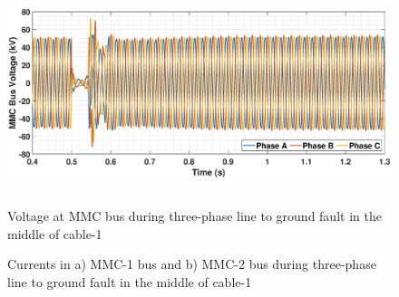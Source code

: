 \begin{figure}[H]
\centering
    \includegraphics[height = 6.5cm,width = 17.5cm]{Diagrams/Chapter_5/VABC_MMC_1_3phaseSC.eps}
    \caption{Voltage at MMC bus during three-phase line to ground fault in the middle of cable-1}
    \label{VABC_MMC_1_3phaseSC}
\end{figure}

\begin{figure}[H]
\hspace*{-1.2cm}

\hspace*{-1.2cm}

\caption{Currents in a) MMC-1 bus and b) MMC-2 bus during three-phase line to ground fault in the middle of cable-1}
\label{fig:IABC_MMC_2_3phaseSC}
\end{figure}


